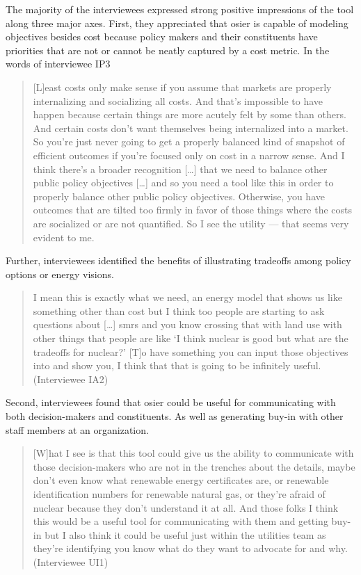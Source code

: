 The majority of the interviewees expressed strong positive impressions of the
tool along three major axes. First, they appreciated that \ac{osier} is capable
of modeling objectives besides cost because policy makers and their constituents
have priorities that are not or cannot be neatly captured by a cost metric. In
the words of interviewee IP3
\begin{quote}
    [L]east costs only make sense if you assume that markets are properly
    internalizing and socializing all costs. And that's impossible to have
    happen because certain things are more acutely felt by some than others. And
    certain costs don't want themselves being internalized into a market. So
    you're just never going to get a properly balanced kind of snapshot of
    efficient outcomes if you're focused only on cost in a narrow sense. And I
    think there's a broader recognition [\dots] that we need to balance other
    public policy objectives [\dots] and so you need a tool like this in order
    to properly balance other public policy objectives. Otherwise, you have
    outcomes that are tilted too firmly in favor of those things where the costs
    are socialized or are not quantified. So I see the utility --- that seems
    very evident to me.
\end{quote}
Further, interviewees identified the benefits of illustrating tradeoffs among
policy options or energy visions.
\begin{quote}
    I mean this is exactly what we need, an energy model that shows us like
    something other than cost but I think too people are starting to ask
    questions about [\dots] \acp{smr} and you know crossing that with land use
    with other things that people are like `I think nuclear is good but what are
    the tradeoffs for nuclear?' [T]o have something you can input those
    objectives into and show you, I think that that is going to be infinitely
    useful. (Interviewee IA2)
\end{quote}

Second, interviewees found that \ac{osier} could be useful for communicating
with both decision-makers and constituents. As well as generating buy-in with
other staff members at an organization.
\begin{quote}
    [W]hat I see is that this tool could give us the ability to communicate with
    those decision-makers who are not in the trenches about the details, maybe
    don't even know what renewable energy certificates are, or renewable
    identification numbers for renewable natural gas, or they're afraid of
    nuclear because they don't understand it at all. And those folks I think
    this would be a useful tool for communicating with them and getting buy-in
    but I also think it could be useful just within the utilities team as
    they're identifying you know what do they want to advocate for and why.
    (Interviewee UI1)
\end{quote}

